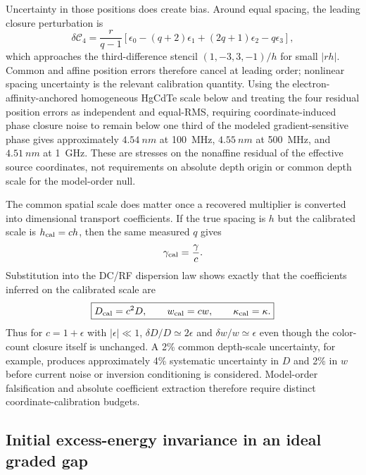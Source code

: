 \documentclass[11pt]{article}
\newcommand{\Cfour}{\mathcal{C}_4}
\begin{document}
Uncertainty in those positions does create bias. Around equal spacing, the leading closure perturbation is
\begin{equation}
\delta\Cfour
=\frac{r}{q-1}\left[\epsilon_0-(q+2)\epsilon_1+(2q+1)\epsilon_2-q\epsilon_3\right],
\end{equation}
which approaches the third-difference stencil $(1,-3,3,-1)/h$ for small $|rh|$. Common and affine position errors therefore cancel at leading order; nonlinear spacing uncertainty is the relevant calibration quantity. Using the electron-affinity-anchored homogeneous HgCdTe scale below and treating the four residual position errors as independent and equal-RMS, requiring coordinate-induced phase closure noise to remain below one third of the modeled gradient-sensitive phase gives approximately $4.54~\si{nm}$ at \SI{100}{MHz}, $4.55~\si{nm}$ at \SI{500}{MHz}, and $4.51~\si{nm}$ at \SI{1}{GHz}. These are stresses on the nonaffine residual of the effective source coordinates, not requirements on absolute depth origin or common depth scale for the model-order null.

The common spatial scale does matter once a recovered multiplier is converted into dimensional transport coefficients. If the true spacing is $h$ but the calibrated scale is $h_{\rm cal}=ch$, then the same measured $q$ gives
\begin{equation}
\gamma_{\rm cal}=\frac{\gamma}{c}.
\end{equation}
Substitution into the DC/RF dispersion law shows exactly that the coefficients inferred on the calibrated scale are
\begin{equation}
\boxed{D_{\rm cal}=c^2D,\qquad w_{\rm cal}=cw,\qquad \kappa_{\rm cal}=\kappa.}
\label{eq:common_scale_bias}
\end{equation}
Thus for $c=1+\epsilon$ with $|\epsilon|\ll1$, $\delta D/D\simeq2\epsilon$ and $\delta w/w\simeq\epsilon$ even though the color-count closure itself is unchanged. A 2\% common depth-scale uncertainty, for example, produces approximately 4\% systematic uncertainty in $D$ and 2\% in $w$ before current noise or inversion conditioning is considered. Model-order falsification and absolute coefficient extraction therefore require distinct coordinate-calibration budgets.

\subsection{Initial excess-energy invariance in an ideal graded gap}
\end{document}
